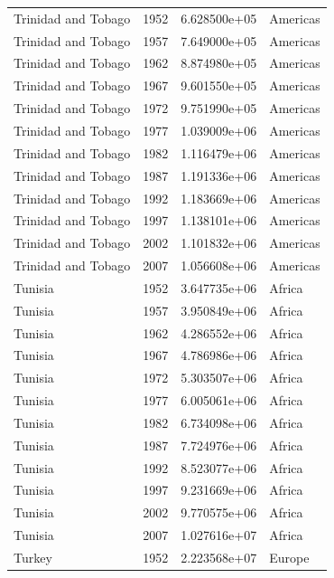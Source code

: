 \documentclass[
  letterpaper,
  DIV=11,
  numbers=noendperiod]{scrreprt}
\begin{document}
\begin{tcolorbox}
\begin{tabular}{lrrl}
Trinidad and Tobago      &  1952 &  6.628500e+05 &  Americas \\
Trinidad and Tobago      &  1957 &  7.649000e+05 &  Americas \\
Trinidad and Tobago      &  1962 &  8.874980e+05 &  Americas \\
Trinidad and Tobago      &  1967 &  9.601550e+05 &  Americas \\
Trinidad and Tobago      &  1972 &  9.751990e+05 &  Americas \\
Trinidad and Tobago      &  1977 &  1.039009e+06 &  Americas \\
Trinidad and Tobago      &  1982 &  1.116479e+06 &  Americas \\
Trinidad and Tobago      &  1987 &  1.191336e+06 &  Americas \\
Trinidad and Tobago      &  1992 &  1.183669e+06 &  Americas \\
Trinidad and Tobago      &  1997 &  1.138101e+06 &  Americas \\
Trinidad and Tobago      &  2002 &  1.101832e+06 &  Americas \\
Trinidad and Tobago      &  2007 &  1.056608e+06 &  Americas \\
Tunisia                  &  1952 &  3.647735e+06 &    Africa \\
Tunisia                  &  1957 &  3.950849e+06 &    Africa \\
Tunisia                  &  1962 &  4.286552e+06 &    Africa \\
Tunisia                  &  1967 &  4.786986e+06 &    Africa \\
Tunisia                  &  1972 &  5.303507e+06 &    Africa \\
Tunisia                  &  1977 &  6.005061e+06 &    Africa \\
Tunisia                  &  1982 &  6.734098e+06 &    Africa \\
Tunisia                  &  1987 &  7.724976e+06 &    Africa \\
Tunisia                  &  1992 &  8.523077e+06 &    Africa \\
Tunisia                  &  1997 &  9.231669e+06 &    Africa \\
Tunisia                  &  2002 &  9.770575e+06 &    Africa \\
Tunisia                  &  2007 &  1.027616e+07 &    Africa \\
Turkey                   &  1952 &  2.223568e+07 &    Europe \\

\end{tabular}
\end{tcolorbox}
\end{document}
